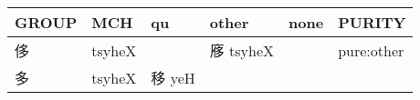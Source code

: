 \documentclass[14pt,a4paper]{scrartcl}
\begin{document}
\begin{longtable}[c]{@{}llllll@{}}
\toprule
\begin{minipage}[b]{0.14\columnwidth}\raggedright\strut
GROUP
\strut\end{minipage} &
\begin{minipage}[b]{0.14\columnwidth}\raggedright\strut
MCH
\strut\end{minipage} &
\begin{minipage}[b]{0.14\columnwidth}\raggedright\strut
qu
\strut\end{minipage} &
\begin{minipage}[b]{0.14\columnwidth}\raggedright\strut
other
\strut\end{minipage} &
\begin{minipage}[b]{0.14\columnwidth}\raggedright\strut
none
\strut\end{minipage} &
\begin{minipage}[b]{0.14\columnwidth}\raggedright\strut
PURITY
\strut\end{minipage}\tabularnewline
\midrule
\endhead
\begin{minipage}[t]{0.14\columnwidth}\raggedright\strut
侈
\strut\end{minipage} &
\begin{minipage}[t]{0.14\columnwidth}\raggedright\strut
tsyheX
\strut\end{minipage} &
\begin{minipage}[t]{0.14\columnwidth}\raggedright\strut
\strut\end{minipage} &
\begin{minipage}[t]{0.14\columnwidth}\raggedright\strut
㢋 tsyheX
\strut\end{minipage} &
\begin{minipage}[t]{0.14\columnwidth}\raggedright\strut
\strut\end{minipage} &
\begin{minipage}[t]{0.14\columnwidth}\raggedright\strut
pure:other
\strut\end{minipage}\tabularnewline
\begin{minipage}[t]{0.14\columnwidth}\raggedright\strut
多
\strut\end{minipage} &
\begin{minipage}[t]{0.14\columnwidth}\raggedright\strut
tsyheX
\strut\end{minipage} &
\begin{minipage}[t]{0.14\columnwidth}\raggedright\strut
移 yeH
\strut\end{minipage} &
\begin{minipage}[t]{0.14\columnwidth}\raggedright\strut

\end{minipage}
\end{longtable}
\end{document}
